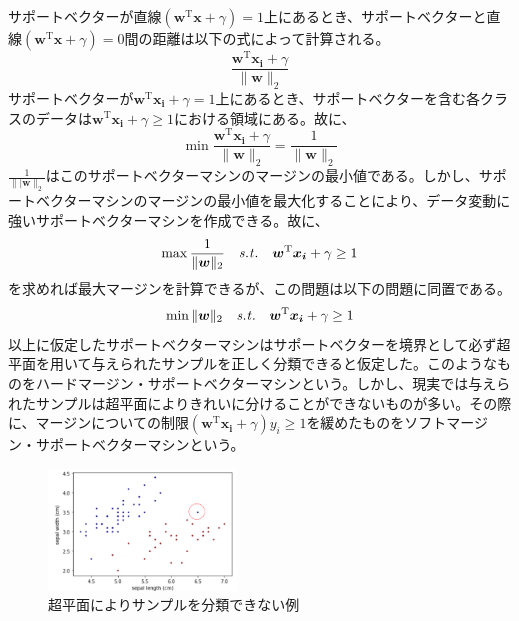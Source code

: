 サポートベクターが直線$(\bm{w}^{\mathrm{T}}\bm{x} + \gamma) = 1$上にあるとき、サポートベクターと直線$(\bm{w}^{\mathrm{T}}\bm{x} + \gamma) = 0$間の距離は以下の式によって計算される。
\begin{equation}
  \frac{\bm{w}^{\mathrm{T}}\bm{x_i} + \gamma}{\|\bm{w}\|_2}
\end{equation}
サポートベクターが$\bm{w}^{\mathrm{T}}\bm{x_i} + \gamma = 1$上にあるとき、サポートベクターを含む各クラスのデータは$\bm{w}^{\mathrm{T}}\bm{x_i} + \gamma \ge 1$における領域にある。故に、
\begin{equation}
  \min\frac{\bm{w}^{\mathrm{T}}\bm{x_i} + \gamma}{\|\bm{w}\|_2} = \frac{1}{\|\bm{w}\|_2}
\end{equation}
$\frac{1}{\|\bm{|w}\|_2}$はこのサポートベクターマシンのマージンの最小値である。しかし、サポートベクターマシンのマージンの最小値を最大化することにより、データ変動に強いサポートベクターマシンを作成できる。故に、
\begin{equation}
  \max\frac{1}{\|\bm{w}\|_2}\text{\ \ \ }{\it{s.t.}}\text{\ \ \ }\bm{w}^{\mathrm{T}}\bm{x_i} + \gamma \ge 1
\end{equation}
を求めれば最大マージンを計算できるが、この問題は以下の問題に同置である。
\begin{equation}
  \min\|\bm{w}\|_2\text{\ \ \ }{\it{s.t.}}\text{\ \ \ }\bm{w}^{\mathrm{T}}\bm{x_i} + \gamma \ge 1
\end{equation}
以上に仮定したサポートベクターマシンはサポートベクターを境界として必ず超平面を用いて与えられたサンプルを正しく分類できると仮定した。このようなものをハードマージン・サポートベクターマシンという。しかし、現実では与えられたサンプルは超平面によりきれいに分けることができないものが多い。その際に、マージンについての制限$(\bm{w}^{\mathrm{T}}\bm{x_i} + \gamma)y_i \ge 1$を緩めたものをソフトマージン・サポートベクターマシンという。
\begin{figure}[h]
  \centering
  \includegraphics[width=5cm]{figure/section1/figure3.png}
  \caption{超平面によりサンプルを分類できない例}
\end{figure}
  



  




